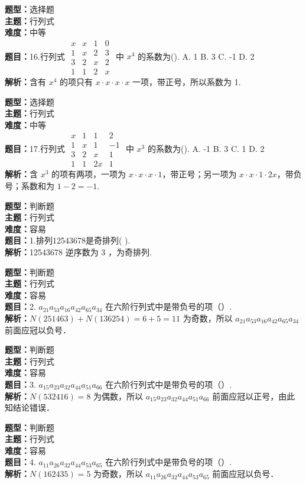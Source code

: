 \documentclass{ctexart}
\newenvironment{question}[5]{%
	\noindent\textbf{题型：}#1\\
	\textbf{主题：}#2\\
	\textbf{难度：}#3\\
	\textbf{题目：}#4\\
	\textbf{解析：}#5\\
	\vspace{1em}
}{}
\begin{document}
	\begin{question}
		{选择题}
		{行列式}
		{中等}
		{16.行列式 \(\begin{matrix}x & x & 1 & 0 \\ 1 & x & 2 & 3 \\ 3 & 2 & x & 2 \\ 1 & 1 & 2 & x\end{matrix}\) 中 \(x^4\) 的系数为(\qquad). A. 1 B. 3 C. -1 D. 2}
		{含有 \(x^4\) 的项只有 \(x\cdot x\cdot x\cdot x\) 一项，带正号，所以系数为 1. }
	\end{question}
	
	\begin{question}
		{选择题}
		{行列式}
		{中等}
		{17.行列式 \(\begin{matrix}x & 1 & 1 & 2 \\ 1 & x & 1 & -1 \\ 3 & 2 & x & 1 \\ 1 & 1 & 2x & 1\end{matrix}\) 中 \(x^3\) 的系数为(\qquad). A. -1 B. 3 C. 1 D. 2}
		{含 \(x^3\) 的项有两项，一项为 \(x\cdot x\cdot x\cdot1\)，带正号；另一项为 \(x\cdot x\cdot1\cdot2x\)，带负号；系数和为 \(1-2=-1\). }
	\end{question}
	
	\begin{question}
		{判断题}
		{行列式}
		{容易}
		{1.排列12543678是奇排列(  ).}
		{12543678 逆序数为 3 ，为奇排列.}
	\end{question}
	
	
	\begin{question}
		{判断题}
		{行列式}
		{容易}
		{2. \(a_{21} a_{53} a_{16} a_{42} a_{65} a_{34}\) 在六阶行列式中是带负号的项（）. }
		{\(N(251463)+N(136254)=6+5=11\) 为奇数，所以 \(a_{21} a_{53} a_{16} a_{42} a_{65} a_{34}\) 前面应冠以负号．}
	\end{question}
	
	\begin{question}
		{判断题}
		{行列式}
		{容易}
		{3. \(a_{15} a_{23} a_{32} a_{44} a_{51} a_{66}\) 在六阶行列式中是带负号的项（）. }
		{\(N(532416)=8\) 为偶数，所以 \(a_{15} a_{23} a_{32} a_{44} a_{51} a_{66}\) 前面应冠以正号，由此知结论错误．}
	\end{question}
	
	\begin{question}
		{判断题}
		{行列式}
		{容易}
		{4. \(a_{11} a_{26} a_{32} a_{44} a_{53} a_{65}\) 在六阶行列式中是带负号的项（）. }
		{\(N(162435)=5\) 为奇数，所以 \(a_{11} a_{26} a_{32} a_{44} a_{53} a_{65}\) 前面应冠以负号．}
	\end{question}
	
\end{document}
